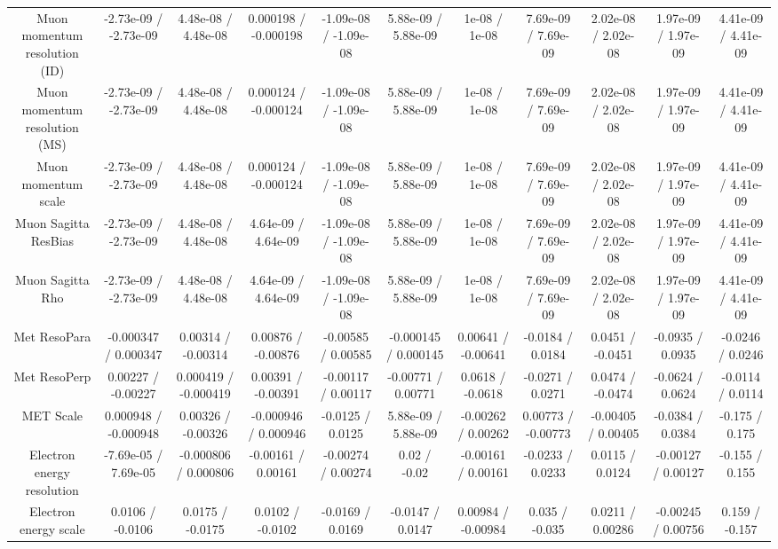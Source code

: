 \begin{table}[htbp]
\begin{center}
\begin{tabular}{|c|c|c|c|c|c|c|c|c|c|c|}
  Muon momentum resolution (ID) & -2.73e-09 / -2.73e-09 & 4.48e-08 / 4.48e-08 & 0.000198 / -0.000198 & -1.09e-08 / -1.09e-08 & 5.88e-09 / 5.88e-09 & 1e-08 / 1e-08 & 7.69e-09 / 7.69e-09 & 2.02e-08 / 2.02e-08 & 1.97e-09 / 1.97e-09 & 4.41e-09 / 4.41e-09 \\ 
  Muon momentum resolution (MS) & -2.73e-09 / -2.73e-09 & 4.48e-08 / 4.48e-08 & 0.000124 / -0.000124 & -1.09e-08 / -1.09e-08 & 5.88e-09 / 5.88e-09 & 1e-08 / 1e-08 & 7.69e-09 / 7.69e-09 & 2.02e-08 / 2.02e-08 & 1.97e-09 / 1.97e-09 & 4.41e-09 / 4.41e-09 \\ 
  Muon momentum scale & -2.73e-09 / -2.73e-09 & 4.48e-08 / 4.48e-08 & 0.000124 / -0.000124 & -1.09e-08 / -1.09e-08 & 5.88e-09 / 5.88e-09 & 1e-08 / 1e-08 & 7.69e-09 / 7.69e-09 & 2.02e-08 / 2.02e-08 & 1.97e-09 / 1.97e-09 & 4.41e-09 / 4.41e-09 \\ 
  Muon Sagitta ResBias & -2.73e-09 / -2.73e-09 & 4.48e-08 / 4.48e-08 & 4.64e-09 / 4.64e-09 & -1.09e-08 / -1.09e-08 & 5.88e-09 / 5.88e-09 & 1e-08 / 1e-08 & 7.69e-09 / 7.69e-09 & 2.02e-08 / 2.02e-08 & 1.97e-09 / 1.97e-09 & 4.41e-09 / 4.41e-09 \\ 
  Muon Sagitta Rho & -2.73e-09 / -2.73e-09 & 4.48e-08 / 4.48e-08 & 4.64e-09 / 4.64e-09 & -1.09e-08 / -1.09e-08 & 5.88e-09 / 5.88e-09 & 1e-08 / 1e-08 & 7.69e-09 / 7.69e-09 & 2.02e-08 / 2.02e-08 & 1.97e-09 / 1.97e-09 & 4.41e-09 / 4.41e-09 \\ 
  Met ResoPara & -0.000347 / 0.000347 & 0.00314 / -0.00314 & 0.00876 / -0.00876 & -0.00585 / 0.00585 & -0.000145 / 0.000145 & 0.00641 / -0.00641 & -0.0184 / 0.0184 & 0.0451 / -0.0451 & -0.0935 / 0.0935 & -0.0246 / 0.0246 \\ 
  Met ResoPerp & 0.00227 / -0.00227 & 0.000419 / -0.000419 & 0.00391 / -0.00391 & -0.00117 / 0.00117 & -0.00771 / 0.00771 & 0.0618 / -0.0618 & -0.0271 / 0.0271 & 0.0474 / -0.0474 & -0.0624 / 0.0624 & -0.0114 / 0.0114 \\ 
  MET Scale & 0.000948 / -0.000948 & 0.00326 / -0.00326 & -0.000946 / 0.000946 & -0.0125 / 0.0125 & 5.88e-09 / 5.88e-09 & -0.00262 / 0.00262 & 0.00773 / -0.00773 & -0.00405 / 0.00405 & -0.0384 / 0.0384 & -0.175 / 0.175 \\ 
  Electron energy resolution & -7.69e-05 / 7.69e-05 & -0.000806 / 0.000806 & -0.00161 / 0.00161 & -0.00274 / 0.00274 & 0.02 / -0.02 & -0.00161 / 0.00161 & -0.0233 / 0.0233 & 0.0115 / 0.0124 & -0.00127 / 0.00127 & -0.155 / 0.155 \\ 
  Electron energy scale & 0.0106 / -0.0106 & 0.0175 / -0.0175 & 0.0102 / -0.0102 & -0.0169 / 0.0169 & -0.0147 / 0.0147 & 0.00984 / -0.00984 & 0.035 / -0.035 & 0.0211 / 0.00286 & -0.00245 / 0.00756 & 0.159 / -0.157 \\ 

\end{tabular}
\end{center}
\end{table}
